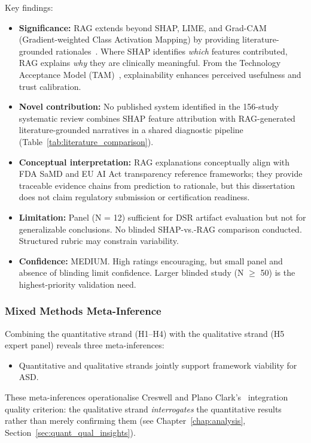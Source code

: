 \noindent Key findings:

\begin{itemize}
    \item \textbf{Significance:} RAG extends beyond SHAP, LIME, and Grad-CAM (Gradient-weighted Class Activation Mapping) by providing literature-grounded rationales~\cite{arrieta2020xai}. Where SHAP identifies \textit{which} features contributed, RAG explains \textit{why} they are clinically meaningful. From the Technology Acceptance Model (TAM)~\cite{davis1989tam}, explainability enhances perceived usefulness and trust calibration.
    \item \textbf{Novel contribution:} No published system identified in the 156-study systematic review combines SHAP feature attribution with RAG-generated literature-grounded narratives in a shared diagnostic pipeline (Table~\ref{tab:literature_comparison}).
    \item \textbf{Conceptual interpretation:} RAG explanations conceptually align with FDA SaMD and EU AI Act transparency reference frameworks; they provide traceable evidence chains from prediction to rationale, but this dissertation does not claim regulatory submission or certification readiness.
    \item \textbf{Limitation:} Panel (N = 12) sufficient for DSR artifact evaluation but not for generalizable conclusions. No blinded SHAP-vs.-RAG comparison conducted. Structured rubric may constrain variability.
    \item \textbf{Confidence:} MEDIUM. High ratings encouraging, but small panel and absence of blinding limit confidence. Larger blinded study (N $\geq$ 50) is the highest-priority validation need.
\end{itemize}

\subsubsection{Mixed Methods Meta-Inference}

Combining the quantitative strand (H1--H4) with the qualitative strand (H5 expert panel) reveals three meta-inferences:

\begin{itemize}[nosep]
\item Quantitative and qualitative strands jointly support framework viability for ASD.
\end{itemize}

\noindent These meta-inferences operationalise Creswell and Plano Clark's~\cite{creswell2018research} integration quality criterion: the qualitative strand \textit{interrogates} the quantitative results rather than merely confirming them (see Chapter~\ref{chap:analysis}, Section~\ref{sec:quant_qual_insights}).

